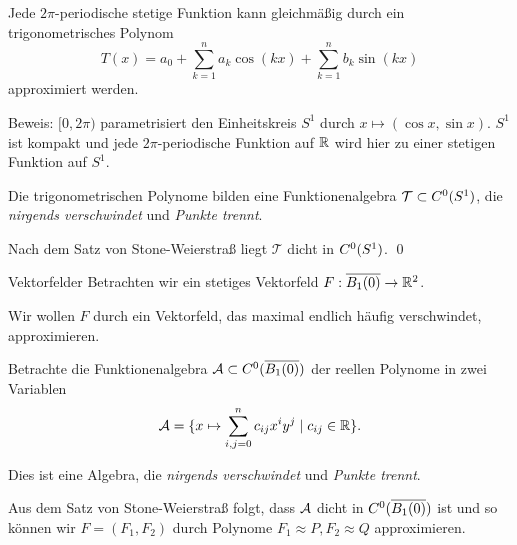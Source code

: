 \begin{frame}
    \begin{satz}
        Jede \(2\pi\)-periodische stetige Funktion kann gleichmäßig durch ein trigonometrisches Polynom 
        \[ T(x) = a_0 + \sum_{k=1}^n a_k \cos(kx) + \sum_{k=1}^n b_k \sin(kx) \]
        approximiert werden.
    \end{satz}
    \pause
    Beweis:
    \( [0,2\pi) \) parametrisiert den Einheitskreis \(S^1\) durch \( x \mapsto (\cos x, \sin x) \). 
    \pause
    \(S^1\) ist kompakt und jede \(2\pi\)-periodische Funktion auf \(\mathbb{R}\) wird hier zu einer 
    stetigen Funktion auf \(S^1\).
    \pause

    Die trigonometrischen Polynome bilden eine Funktionenalgebra \( \mathcal{T} \subset C^0(S^1) \), 
    die \textit{nirgends verschwindet} und \textit{Punkte trennt}.
    \pause

    Nach dem Satz von Stone-Weierstraß liegt \( \mathcal{T} \) dicht in \( C^0(S^1) \). \qed
\end{frame}

\newcommand{\B}{\overline{B_1(0)}}

\begin{frame}{Vektorfelder}
    Betrachten wir ein stetiges Vektorfeld 
    \( \abb{F}{\B}{\R^2} \).\pause

    Wir wollen \( F \) durch ein Vektorfeld, das maximal endlich 
    häufig verschwindet, approximieren.
    \pause

    Betrachte die Funktionenalgebra \( \A \subset \C(\B) \) 
    der reellen Polynome in zwei Variablen \pause
    \[ \mathcal{A} = \{ x \mapsto \sum_{i,j=0}^n c_{ij} x^i y^j \;|\; c_{ij} \in \mathbb{R} \}. \]
    \pause

    Dies ist eine Algebra, die \textit{nirgends verschwindet} und \textit{Punkte trennt}.
    \pause

    Aus dem Satz von Stone-Weierstraß folgt, dass \(\mathcal{A}\) dicht in \( \C(\B) \) ist 
    und so können wir \( F = (F_1, F_2) \) durch Polynome 
    \( F_1 \approx P, F_2 \approx Q \) approximieren.
\end{frame}